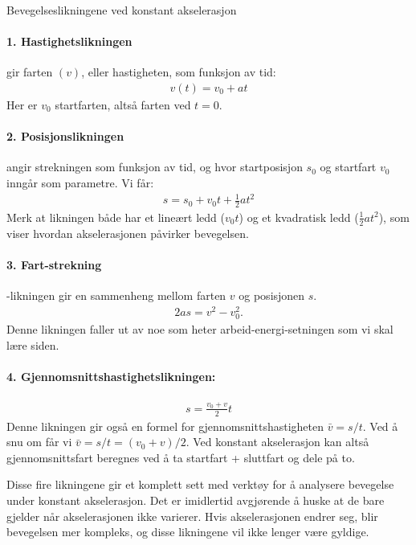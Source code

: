 \begin{myoppsum*}{Bevegelseslikningene ved konstant akselerasjon}
\paragraph{1. Hastighetslikningen} gir farten $(v)$, eller hastigheten, som funksjon av tid:
    \begin{align}
        v(t)= v_0 + at
    \end{align}
   Her er \( v_0 \) startfarten, altså farten ved $t=0$.

    \paragraph{2. Posisjonslikningen} angir strekningen som funksjon av tid, og hvor startposisjon $s_0$ og startfart $v_0$ inngår som parametre. Vi får:
    \begin{align}
        s = s_0 + v_0t + \frac{1}{2}at^2
    \end{align}
    Merk at likningen både har et lineært ledd (\( v_0t \)) og et kvadratisk ledd (\( \frac{1}{2}at^2 \)), som viser hvordan akselerasjonen påvirker bevegelsen.

    \paragraph{3. Fart-strekning}-likningen gir en sammenheng mellom farten $v$ og posisjonen $s$.
    \begin{align}
       2as=v^2-v_0^2.
    \end{align}
    Denne likningen faller ut av noe som heter arbeid-energi-setningen som vi skal lære siden.

    \paragraph{4. Gjennomsnittshastighetslikningen:}
    \begin{align}
        s =\frac{v_0 + v}{2}t 
    \end{align}
    Denne likningen gir også en formel for gjennomsnittshastigheten $\bar{v}=s/t$. Ved å snu om får vi $\bar{v}=s/t=(v_0+v)/2$. Ved konstant akselerasjon kan altså gjennomsnittsfart beregnes ved å ta startfart + sluttfart og dele på to.
\end{myoppsum*}

 Disse fire likningene gir et komplett sett med verktøy for å analysere bevegelse under konstant akselerasjon. Det er imidlertid avgjørende å huske at de bare gjelder når akselerasjonen ikke varierer. Hvis akselerasjonen endrer seg, blir bevegelsen mer kompleks, og disse likningene vil ikke lenger være gyldige.

